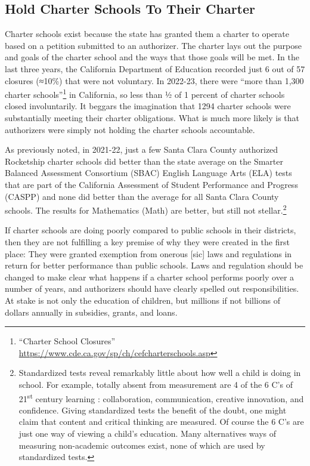 \subsection{Hold Charter Schools To Their Charter}%
\label{sec:hold-charter-schools}\indent

Charter schools exist because the state has granted them a charter to operate based on a petition submitted to an authorizer. The charter lays out the purpose and goals of the charter school and the ways that those goals will be met. In the last three years, the California Department of Education  recorded just 6 out of 57 closures (≈10\%) that were not voluntary. In 2022-23, there were ``more than 1,300 charter schools''\footnote{``Charter School Closures'' \url{https://www.cde.ca.gov/sp/ch/cefcharterschools.asp}} in California, so less than ½ of 1 percent of charter schools closed involuntarily. It beggars the imagination that 1294 charter schools were substantially meeting their charter obligations. What is much more likely is that authorizers were simply not holding the charter schools accountable.

As previously noted, in 2021-22, just a few Santa Clara County authorized Rocketship charter schools did better than the state average on the Smarter Balanced Assessment Consortium (SBAC) English Language Arts (ELA) tests that are part of the California Assessment of Student Performance and Progress (CASPP) and none did better than the average for all Santa Clara County schools. The results for Mathematics (Math) are better, but still not stellar.\footnote{Standardized tests reveal remarkably little about how well a child is doing in school. For example, totally absent from measurement are 4 of the 6 C's of 21\textsuperscript{st}  century learning \parencite{Hirsh-Pasek.etal2020}: collaboration, communication, creative innovation, and confidence. Giving standardized tests the benefit of the doubt, one might claim that content and critical thinking are measured. Of course the 6 C's are just one way of viewing a child's education. Many alternatives ways of measuring non-academic outcomes exist, none of which are used by standardized tests.}

If charter schools are doing poorly compared to public schools in their districts, then they are not fulfilling a key premise of why they were created in the first place: They were granted exemption from onerous [sic] laws and regulations in return for better performance than public schools. Laws and regulation should be changed to make clear what happens if a charter school performs poorly over a number of years, and authorizers should have clearly spelled out responsibilities. At stake is not only the education of children, but millions if not billions of dollars annually in subsidies, grants, and loans.

